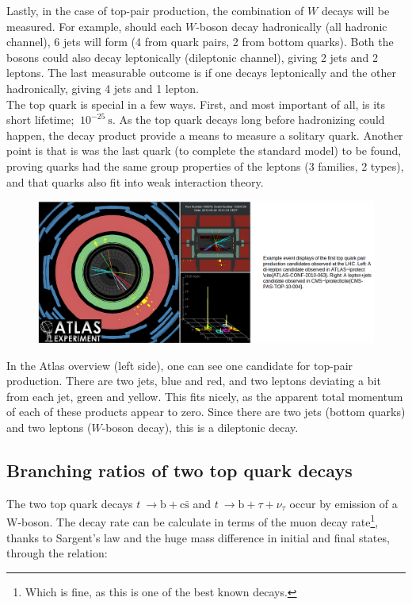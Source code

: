 \documentclass[11pt,a4paper]{article}
\begin{document}
Lastly, in the case of top-pair production, the combination of $W$ decays will be measured. For example, should each $W$-boson decay hadronically (all hadronic channel), 6 jets will form (4 from quark pairs, 2 from bottom quarks). Both the bosons could also decay leptonically (dileptonic channel), giving 2 jets and 2 leptons. The last measurable outcome is if one decays leptonically and the other hadronically, giving 4 jets and 1 lepton.\\

The top quark is special in a few ways. First, and most important of all, is its short lifetime; $~10^{-25}\:\text{s}$. As the top quark decays long before hadronizing could happen, the decay product provide a means to measure a solitary quark. Another point is that is was the last quark (to complete the standard model) to be found, proving quarks had the same group properties of the leptons (3 families, 2 types), and that quarks also fit into weak interaction theory.\\

\begin{figure}
	\includegraphics[width=\textwidth]{Overview.png}
\end{figure}

In the Atlas overview (left side), one can see one candidate for top-pair production. There are two jets, blue and red, and two leptons deviating a bit from each jet, green and yellow. This fits nicely, as the apparent total momentum of each of these products appear to zero. Since there are two jets (bottom quarks) and two leptons ($W$-boson decay), this is a dileptonic decay.

\subsection{Branching ratios of two top quark decays}
The two top quark decays $t\:\rightarrow\text{b}+\text{c}\bar{\text{s}}$ and $t\:\rightarrow\text{b}+\tau+\nu_\tau$ occur by emission of a W-boson. The decay rate can be calculate in terms of the muon decay rate\footnote{Which is fine, as this is one of the best known decays.}, thanks to Sargent's law and the huge mass difference in initial and final states, through the relation:
\end{document}
